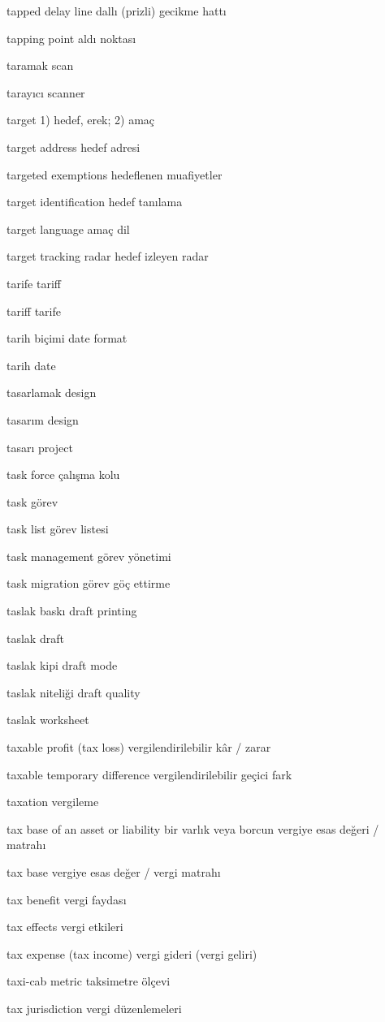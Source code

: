 \documentclass[12pt,fleqn]{article}\usepackage{../../common}
\begin{document}
tapped delay line dallı (prizli) gecikme hattı

tapping point aldı noktası

taramak scan

tarayıcı scanner

target 1) hedef, erek; 2) amaç

target address hedef adresi

targeted exemptions hedeflenen muafiyetler

target identification hedef tanılama

target language amaç dil

target tracking radar hedef izleyen radar

tarife tariff

tariff tarife

tarih biçimi date format

tarih date

tasarlamak design

tasarım design

tasarı project

task force çalışma kolu

task görev

task list görev listesi

task management görev yönetimi

task migration görev göç ettirme

taslak baskı draft printing

taslak draft

taslak kipi draft mode

taslak niteliği draft quality

taslak worksheet

taxable profit (tax loss) vergilendirilebilir kâr / zarar

taxable temporary difference vergilendirilebilir geçici fark

taxation vergileme

tax base of an asset or liability bir varlık veya borcun vergiye esas değeri / matrahı

tax base vergiye esas değer / vergi matrahı

tax benefit vergi faydası

tax effects vergi etkileri

tax expense (tax income) vergi gideri (vergi geliri)

taxi-cab metric taksimetre ölçevi

tax jurisdiction vergi düzenlemeleri
\end{document}
